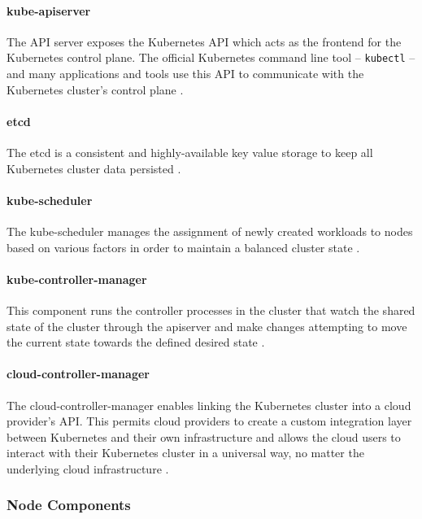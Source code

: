 \paragraph{kube-apiserver} The API server exposes the Kubernetes API which acts as the frontend for the Kubernetes control plane. The official Kubernetes command line tool -- \texttt{kubectl} -- and many applications and tools use this API to communicate with the Kubernetes cluster's control plane \cite{KubernetesArchitecture}.

\paragraph{etcd} The etcd is a consistent and highly-available key value storage to keep all Kubernetes cluster data persisted \cite{KubernetesArchitecture}.

\paragraph{kube-scheduler} The kube-scheduler manages the assignment of newly created workloads to nodes based on various factors in order to maintain a balanced cluster state \cite{KubernetesArchitecture}.

\paragraph{kube-controller-manager} This component runs the controller processes in the cluster that watch the shared state of the cluster through the apiserver and make changes attempting to move the current state towards the defined desired state \cite{KubernetesArchitecture}.

\paragraph{cloud-controller-manager} The cloud-controller-manager enables linking the Kubernetes cluster into a cloud provider's API. This permits cloud providers to create a custom integration layer between Kubernetes and their own infrastructure and allows the cloud users to interact with their Kubernetes cluster in a universal way, no matter the underlying cloud infrastructure \cite{KubernetesArchitecture}.

\subsubsection{Node Components}

